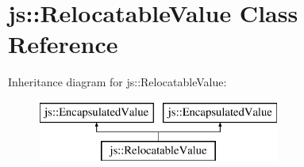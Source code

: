 \hypertarget{classjs_1_1_relocatable_value}{\section{js\-:\-:Relocatable\-Value Class Reference}
\label{classjs_1_1_relocatable_value}
}
Inheritance diagram for js\-:\-:Relocatable\-Value\-:\begin{figure}[H]
\begin{center}
\leavevmode
\includegraphics[height=2.000000cm]{classjs_1_1_relocatable_value}
\end{center}
\end{figure}
